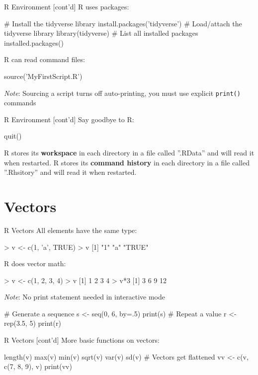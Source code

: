 \documentclass[ignorenonframetext,xcolor=x11names]{beamer}
\begin{document}
\begin{frame}[fragile]{R Environment \small [cont'd]}
R uses packages:
\begin{Rcode}
# Install the tidyverse library
install.packages('tidyverse')
# Load/attach the tidyverse library
library(tidyverse)
# List all installed packages
installed.packages()
\end{Rcode}
R can read command files:
\begin{Rcode}
source('MyFirstScript.R')
\end{Rcode}
\emph{Note}: Sourcing a script turns off auto-printing, you must use explicit \texttt{print()} commands
\end{frame}

\begin{frame}[fragile]{R Environment \small [cont'd]}
Say goodbye to R:
\begin{Rcode}
quit()
\end{Rcode}
R stores its \textbf{workspace} in each directory in a file called ''.RData'' and will read it when restarted. R stores its \textbf{command history} in each directory in a file called ''.Rhsitory'' and will read it when restarted.
\end{frame}

\section{Vectors}

\begin{frame}[fragile]{R Vectors}
All elements have the same type:
\begin{Rcode}
> v <- c(1, 'a', TRUE)
> v
[1] "1"    "a"    "TRUE"
\end{Rcode}
R does vector math:
\begin{Rcode}
> v <- c(1, 2, 3, 4)
> v
[1] 1 2 3 4
> v*3
[1]  3  6  9 12
\end{Rcode}
\emph{Note}: No print statement needed in interactive mode

\begin{Rcode}
# Generate a sequence
s <- seq(0, 6, by=.5)
print(s)
# Repeat a value
r <- rep(3.5, 5)
print(r)
\end{Rcode}
\end{frame}

\begin{frame}[fragile]{R Vectors \small [cont'd]}
More basic functions on vectors:
\begin{Rcode}
length(v)
max(v)
min(v)
sqrt(v)
var(v)
sd(v)
# Vectors get flattened
vv <- c(v, c(7, 8, 9), v)
print(vv)
\end{Rcode}
\end{frame}
\end{document}
